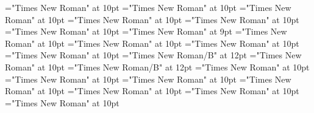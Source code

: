 \documentclass[gps1,twoside]{article}
\begin{document}
\font\spandefinitionorglossreferencedentryreferencedentriesvisiblevariantentryrefvisiblevariantentryrefsminorentrycomplexfirstchildbefore="Times New Roman" at 10pt
\font\spanspansummaryvisiblevariantentryrefvisiblevariantentryrefsminorentrycomplexbefore="Times New Roman" at 10pt
\font\spansummaryvisiblevariantentryrefvisiblevariantentryrefsminorentrycomplexfirstchildbefore="Times New Roman" at 10pt
\font\spanspancomplexformentryrefsminorentrycomplexbefore="Times New Roman" at 10pt
\font\complexformentryrefsminorentrycomplexbefore="Times New Roman" at 10pt
\font\complexformentryrefsminorentrycomplexafter="Times New Roman" at 10pt
\font\complexformtypecomplexformtypecomplexformtypescomplexformentryrefcomplexformentryrefsminorentrycomplexbefore="Times New Roman" at 9pt
\font\complexformtypescomplexformentryrefcomplexformentryrefsminorentrycomplexafter="Times New Roman" at 10pt
\font\spanspanabbreviationcomplexformtypecomplexformtypescomplexformentryrefcomplexformentryrefsminorentrycomplexbefore="Times New Roman" at 10pt
\font\spanabbreviationcomplexformtypecomplexformtypescomplexformentryrefcomplexformentryrefsminorentrycomplexlastchildafter="Times New Roman" at 10pt
\font{}="Times New Roman" at 10pt
\font\spanbzhheadwordreferencedentryreferencedentriescomplexformentryrefcomplexformentryrefsminorentrycomplex="Times New Roman/B" at 12pt
\font\spanspanheadwordreferencedentryreferencedentriescomplexformentryrefcomplexformentryrefsminorentrycomplexbefore="Times New Roman" at 10pt
\font\spanheadwordreferencedentryreferencedentriescomplexformentryrefcomplexformentryrefsminorentrycomplex="Times New Roman/B" at 12pt
\font\spanspandefinitionorglossreferencedentryreferencedentriescomplexformentryrefcomplexformentryrefsminorentrycomplexbefore="Times New Roman" at 10pt
\font\spandefinitionorglossreferencedentryreferencedentriescomplexformentryrefcomplexformentryrefsminorentrycomplexfirstchildbefore="Times New Roman" at 10pt
\font\spanspansummarycomplexformentryrefcomplexformentryrefsminorentrycomplexbefore="Times New Roman" at 10pt
\font\spansummarycomplexformentryrefcomplexformentryrefsminorentrycomplexfirstchildbefore="Times New Roman" at 10pt
\font\nontrivialentryrootnontrivialentryrootnontrivialentryrootscomplexformentryrefcomplexformentryrefsminorentrycomplexbefore="Times New Roman" at 10pt
\font\nontrivialentryrootscomplexformentryrefcomplexformentryrefsminorentrycomplexbefore="Times New Roman" at 10pt
\font\spanspansummarydefinitionminorentrycomplexbefore="Times New Roman" at 10pt
\end{document}
